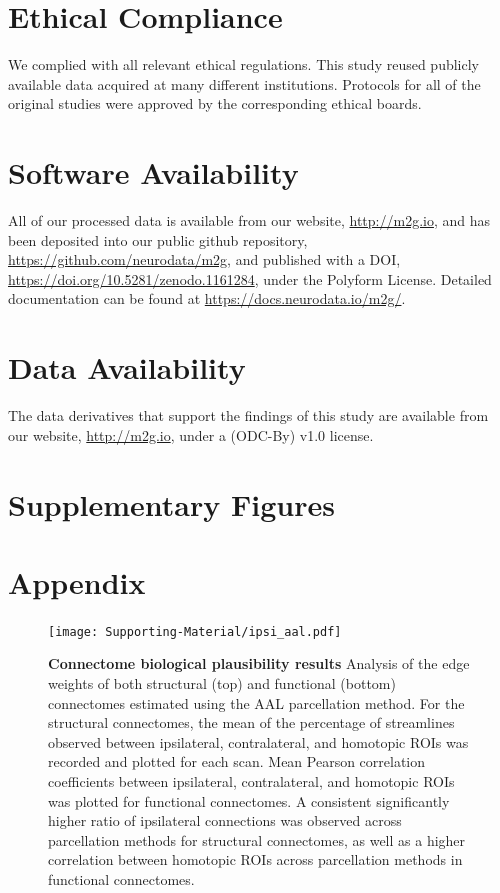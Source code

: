 \section{Ethical Compliance}
We complied with all relevant ethical regulations. This study reused publicly available data acquired at many different institutions. Protocols for all of the original studies were approved by the corresponding ethical boards.

\section{Software Availability}
All of our processed data is available from our website, \url{http://m2g.io}, and has been deposited into our public github repository, \url{https://github.com/neurodata/m2g}, and published with a DOI, \url{https://doi.org/10.5281/zenodo.1161284}, under the Polyform License. Detailed documentation can be found at \url{https://docs.neurodata.io/m2g/}.

\section{Data Availability}
The data derivatives that support the findings of this study are available from our website, \url{http://m2g.io},  under a (ODC-By) v1.0 license.


\section{Supplementary Figures}

\section{Appendix}

\begin{figure}[b!]
    \centering
    \texttt{[image: Supporting-Material/ipsi\_aal.pdf]}
    \caption[Analysis of the edge weights of both structural (top) and functional (bottom) connectomes estimated using the AAL parcellation method.]{\textbf{Connectome biological plausibility results} Analysis of the edge weights of both structural (top) and functional (bottom) connectomes estimated using the AAL parcellation method. For the structural connectomes, the mean of the percentage of streamlines observed between ipsilateral, contralateral, and homotopic ROIs was recorded and plotted for each scan. Mean Pearson correlation coefficients between ipsilateral, contralateral, and homotopic ROIs was plotted for functional connectomes. A consistent significantly higher ratio of ipsilateral connections was observed across parcellation methods for structural connectomes, as well as a higher correlation between homotopic ROIs across parcellation methods in functional connectomes.}
    \label{fig:ipsi_aal}
\end{figure}

